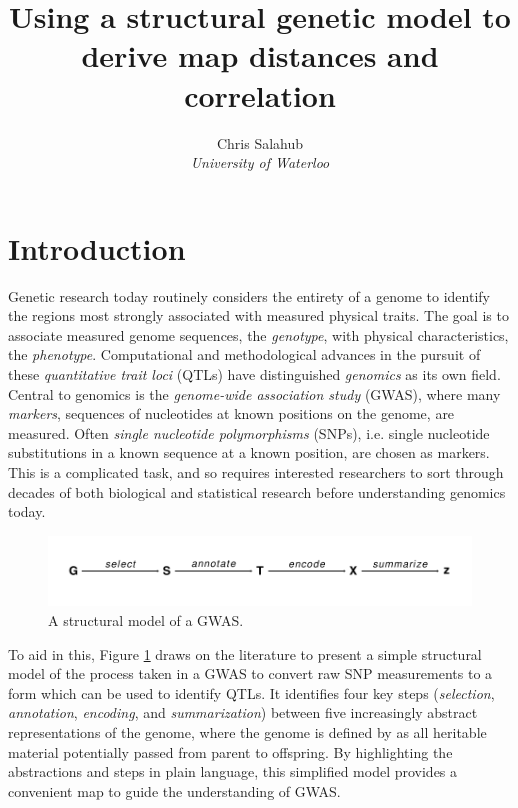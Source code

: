 \documentclass{article}
\title{Using a structural genetic model to derive map distances and correlation}
\author{Chris Salahub \\
	\textit{University of Waterloo}}
\begin{document}
	
\maketitle

\section{Introduction} \label{sec:intro}


Genetic research today routinely considers the entirety of a genome to identify the regions most strongly associated with measured physical traits. The goal is to associate measured genome sequences, the \emph{genotype}, with physical characteristics, the \emph{phenotype}. Computational and methodological advances in the pursuit of these \emph{quantitative trait loci} (QTLs) have distinguished \emph{genomics} as its own field. Central to genomics is the \emph{genome-wide association study} (GWAS), where many \emph{markers}, sequences of nucleotides at known positions on the genome, are measured. Often \emph{single nucleotide polymorphisms} (SNPs), i.e. single nucleotide substitutions in a known sequence at a known position, are chosen as markers. This is a complicated task, and so requires interested researchers to sort through decades of both biological and statistical research before understanding genomics today.

\begin{figure}[!ht]
  \begin{center}
  \includegraphics[scale = 1]{./img/modelDiagram.pdf}
  \caption{A structural model of a GWAS.}
  \label{fig:modelDiagram}
\end{center}
\end{figure}

To aid in this, Figure \ref{fig:modelDiagram} draws on the literature to present a simple structural model of the process taken in a GWAS to convert raw SNP measurements to a form which can be used to identify QTLs. It identifies four key steps (\emph{selection}, \emph{annotation}, \emph{encoding}, and \emph{summarization}) between five increasingly abstract representations of the genome, where the genome is defined by \cite{doergeetal1997search} as all heritable material potentially passed from parent to offspring. By highlighting the abstractions and steps in plain language, this simplified model provides a convenient map to guide the understanding of GWAS.
\end{document}
